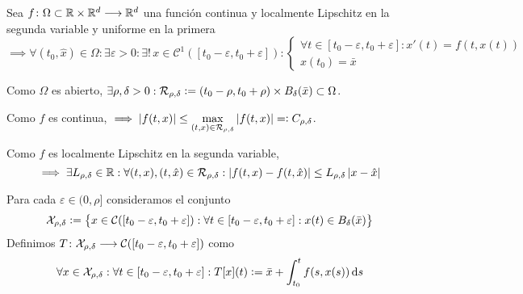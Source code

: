 \begin{teo}
	Sea $f \colon \Omega \subset \mathbb{R} \times \mathbb{R}^d \longrightarrow \mathbb{R}^d$ una función continua y localmente Lipschitz en la segunda variable y uniforme en la primera
	\[\implies \forall (t_0, \hat{x}) \in \Omega : \exists \varepsilon > 0 : \exists! \, x \in \mathcal{C}^1([t_0-\varepsilon, t_0+\varepsilon]) : \begin{cases}
			\forall t \in [t_0-\varepsilon, t_0+\varepsilon] : x'(t) = f(t, x(t)) \\
			x(t_0) = \bar{x}
		\end{cases}\]
	\begin{dem}
		Como $\Omega$ es abierto, $\exists \rho, \delta > 0 : \mathcal{R}_{\rho, \delta} \vcentcolon= (t_0-\rho, t_0+\rho) \times B_{\delta}(\bar{x}) \subset \Omega$.

		Como $f$ es continua, $\displaystyle \implies \left|f(t, x)\right| \leq \max_{(t, x) \in \mathcal{R}_{\rho, \delta}} \left|f(t, x)\right| =\vcentcolon C_{\rho, \delta}$.

		Como $f$ es localmente Lipschitz en la segunda variable,
		\[\implies \exists L_{\rho, \delta} \in \mathbb{R} : \forall (t, x), (t, \hat{x}) \in \mathcal{R}_{\rho, \delta} : \left|f(t, x) - f(t, \hat{x})\right| \leq L_{\rho, \delta} \left|x-\hat{x}\right|\]

		Para cada $\varepsilon \in (0, \rho]$ consideramos el conjunto
		\[\mathcal{X}_{\rho, \delta} \vcentcolon= \big\{x \in \mathcal{C}([t_0-\varepsilon, t_0+\varepsilon]) : \forall t \in [t_0-\varepsilon, t_0 + \varepsilon] :x(t) \in B_\delta(\bar{x})\big\}\]
		Definimos $T \colon \mathcal{X}_{\rho, \delta} \longrightarrow \mathcal{C}([t_0-\varepsilon, t_0+\varepsilon])$ como
		\[\forall x \in \mathcal{X}_{\rho, \delta} : \forall t \in [t_0-\varepsilon, t_0+\varepsilon] : T[x](t) \defeq \bar{x} + \int_{t_0}^{t} f(s, x(s)) \odif{s}\]


\end{dem}
\end{teo}
